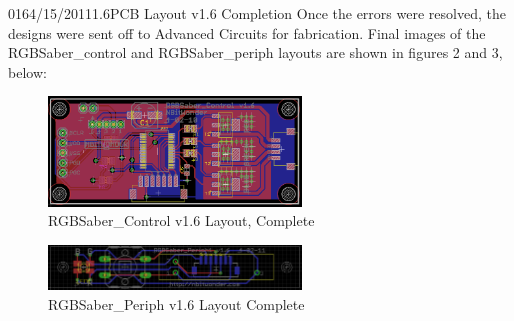 \documentclass[12pt,letterpaper,onecolumn]{article}
\begin{document}
\begin{nbentry}{016}{4/15/2011}{1.6}{PCB Layout v1.6 Completion}
\indent Once the errors were resolved, the designs were sent off to Advanced Circuits for fabrication. Final images of the RGBSaber\_control and RGBSaber\_periph layouts are shown in figures 2 and 3, below:
\begin{figure}[hbp]
\begin{center}
\includegraphics[width=0.6\textwidth]{img/RGBSaberControlv16LayoutComplete.png}
\end{center}
\caption{RGBSaber\_Control v1.6 Layout, Complete}
\label{fig: rgbsaber1.6controllay}
\end{figure}
%
\begin{figure}[hbp]
\begin{center}
\includegraphics[width=0.6\textwidth]{img/RGBSaberPeriphv16LayoutComplete.png}
\end{center}
\caption{RGBSaber\_Periph v1.6 Layout Complete}
\label{fig: rgbsaber1.6periphlay}
\end{figure}
%
\end{nbentry}
%
\end{document}
